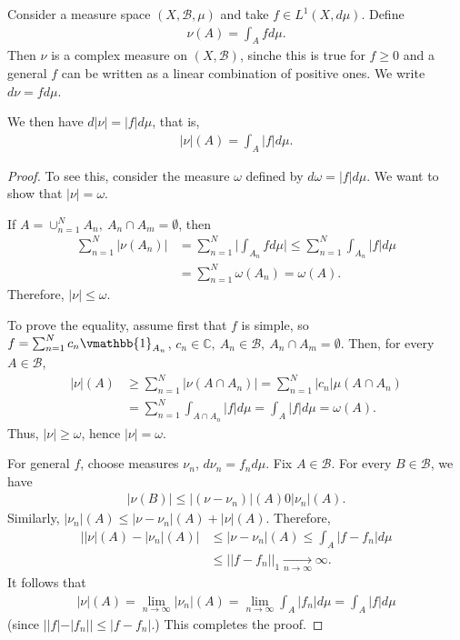 \begin{example}
    Consider a measure space \((X,\mathscr{B},\mu)\) and take \(f\in L^1(X,d\mu)\). Define 
    \begin{align*}
        \nu(A) = \int_{A}fd\mu.
    \end{align*}
    Then \(\nu\) is a complex measure on \((X,\mathscr{B})\), sinche this is true for \(f\geq 0\) and a general \(f\) can be written as a linear combination of positive ones. We write \(d\nu = fd\mu\). 

    We then have \(d|\nu|=|f|d\mu\), that is,
    \begin{align*}
        |\nu|(A) = \int_{A}|f|d\mu.
    \end{align*}
\end{example}
\ifdetailed
\begin{proof}
    To see this, consider the measure \(\omega\) defined by \(d\omega = |f|d\mu\). We want to show that \(|\nu|=\omega\).

    If \(A=\cup_{n=1}^{N}A_n, \ A_n\cap A_m=\emptyset\), then
    \begin{align*}
        \sum\limits_{n=1}^{N} |\nu(A_n)| &= \sum\limits_{n=1}^{N}\Big\vert \int_{A_n}fd\mu\Big\vert \leq \sum\limits_{n=1}^{N}\int_{A_n}|f|d\mu \\
        &= \sum\limits_{n=1}^{N}\omega(A_n) = \omega(A). 
    \end{align*}
    Therefore, \(|\nu|\leq \omega\).

    To prove the equality, assume first that \(f\) is simple, so \(f=\sum_{n=1}^{N}c_n\vmathbb{1}_{A_n}\), \(c_n\in\mathbb{C}, \ A_n\in\mathscr{B}, \ A_n\cap A_m=\emptyset\). Then, for every \(A\in\mathscr{B}\),
    \begin{align*}
        |\nu|(A) &\geq \sum\limits_{n=1}^{N}|\nu\left(A\cap A_n\right)| = \sum\limits_{n=1}^{N}|c_n|\mu\left(A\cap A_n\right) \\
        &= \sum\limits_{n=1}^{N}\int_{A\cap A_n} |f|d\mu = \int_A |f|d\mu = \omega(A).
    \end{align*}
    Thus, \(|\nu|\geq \omega\), hence \(|\nu| = \omega\).

    For general \(f\), choose measures \(\nu_n\), \(d\nu_n = f_nd\mu\). Fix \(A\in\mathscr{B}\). For every \(B\in\mathscr{B}\), we have
    \begin{align*}
        |\nu(B)| \leq |(\nu-\nu_n)|(A) 0 |\nu_n|(A).
    \end{align*}
    Similarly, \(|\nu_n|(A)\leq|\nu-\nu_n|(A) + |\nu|(A)\). Therefore,
    \begin{align*}
        \Big\vert|\nu|(A) - |\nu_n|(A) \Big\vert &\leq |\nu-\nu_n|(A) \leq \int_A |f-f_n|d\mu \\
        &\leq ||f-f_n||_1\xrightarrow[n\rightarrow\infty]{ }\infty.
    \end{align*}
    It follows that
    \begin{align*}
        |\nu|(A) = \lim\limits_{n\rightarrow\infty}|\nu_n|(A) = \lim\limits_{n\rightarrow\infty}\int_A|f_n|d\mu = \int_A|f|d\mu 
    \end{align*}
    (since \(||f|-|f_n|| \leq |f - f_n|\).) This completes the proof.
\end{proof}
